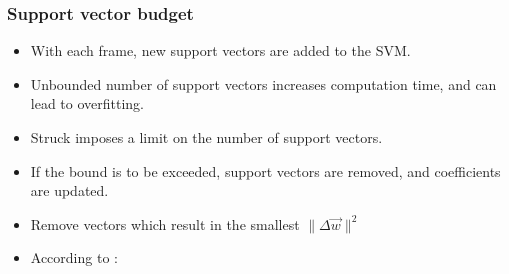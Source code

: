 %

\begin{frame}
    \frametitle{Support vector budget}
    \begin{itemize}
        \item With each frame, new support vectors are added to the SVM.
        \item Unbounded number of support vectors increases computation time, and can lead to
            overfitting.
        \item Struck imposes a limit on the number of support vectors.
        \item If the bound is to be exceeded, support vectors are removed, and coefficients are
            updated.
        \item Remove vectors which result in the smallest \(\|\Delta \vec{w}\|^2\)
        \item According to \cite{6126251}: \struckWeightChange
    \end{itemize}
\end{frame}
